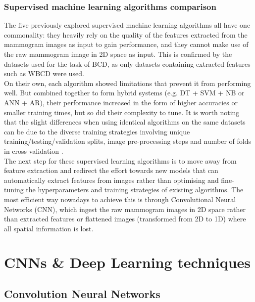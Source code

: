 \subsubsection{Supervised machine learning algorithms comparison}

The five previously explored supervised machine learning algorithms all have one commonality: they heavily rely on the quality of the features extracted from the mammogram images as input to gain performance, and they cannot make use of the raw mammogram image in 2D space as input. This is confirmed by the datasets used for the task of BCD, as only datasets containing extracted features such as WBCD were used.\\

On their own, each algorithm showed limitations that prevent it from performing well. But combined together to form hybrid systems (e.g. DT + SVM + NB or ANN + AR), their performance increased in the form of higher accuracies or smaller training times, but so did their complexity to tune. It is worth noting that the slight differences when using identical algorithms on the same datasets can be due to the diverse training strategies involving unique training/testing/validation splits, image pre-processing steps and number of folds in cross-validation \citep{Yue2018}.\\

The next step for these supervised learning algorithms is to move away from feature extraction and redirect the effort towards new models that can automatically extract features from images rather than optimising and fine-tuning the hyperparameters and training strategies of existing algorithms. The most efficient way nowadays to achieve this is through Convolutional Neural Networks (CNN), which ingest the raw mammogram images in 2D space rather than extracted features or flattened images (transformed from 2D to 1D) where all spatial information is lost.


\section{CNNs \& Deep Learning techniques}
\label{sec:litsurvey-DLtechniques-CNN}

\subsection{Convolution Neural Networks}

